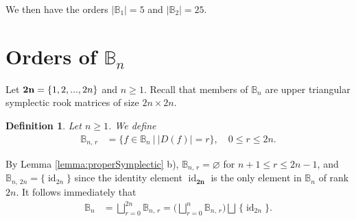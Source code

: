 \documentclass[11pt]{article}
\newtheorem{defi}[theorem]{Definition}
\newcommand{\q}{\quad}
\newcommand{\ges}{\geqslant}
\newcommand{\les}{\leqslant}
\newcommand{\mb}{\mathbf}
\DeclareMathOperator{\id}{id}
\begin{document}
\noindent
We then have the orders $|\mathbb B_1| = 5$ and $|\mathbb B_2| = 25$.

\section{Orders of $\mathbb B_n$}\label{mainSection}

Let ${\bf 2n}=\{1, 2, ..., 2n\}$ and $n\ges 1$. Recall that members of $\mathbb B_n$ are upper triangular symplectic rook matrices of size $2n\times 2n$.
%
\begin{defi} Let $n\ges 1$. We define
\begin{align*}
\mathbb B_{n,\,r}&=\{ f\in \mathbb B_n ~\big|~|D(f)|=r\},\q 0\les r\les 2n.
\end{align*}
\end{defi}
By Lemma \ref{lemma:properSymplectic} b), $\mathbb B_{n,\,r}=\varnothing$ for $n+1\les r\les 2n-1$, and $\mathbb B_{n,\,2n}=\{\id_{2n}\}$ since the identity element $\id_{\mb{2n}}$ is the only element in $\mathbb B_n$ of rank $2n$. 
It follows immediately that
\begin{align*}
    \mathbb{B}_n &= \bigsqcup_{r=0}^{2n} \mathbb{B}_{n,\, r}= \Big(\bigsqcup_{r=0}^{n} \mathbb{B}_{n,\, r}\Big)\bigsqcup\,\{\id_{2n}\}.
\end{align*}
\end{document}
